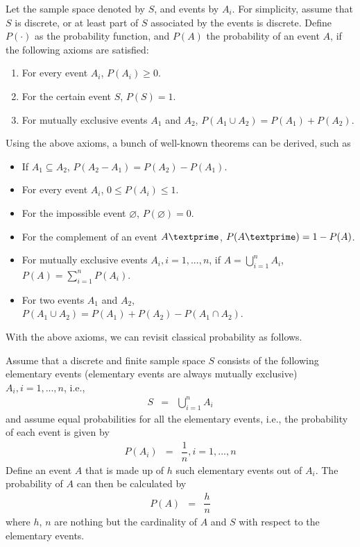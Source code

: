 Let the sample space denoted by $S$, and events by $A_i$. For simplicity, assume that $S$ is discrete, or at least part of $S$ associated by the events is discrete. Define $P(\cdot)$ as the probability function, and $P(A)$ the probability of an event $A$, if the following axioms are satisfied:
\begin{enumerate}
  \item For every event $A_i$, $P(A_i)\geq 0$.
  \item For the certain event $S$, $P(S)=1$.
  \item For mutually exclusive events $A_1$ and $A_2$, $P\left(A_1\cup A_2\right) = P(A_1)+P(A_2)$.
\end{enumerate}

Using the above axioms, a bunch of well-known theorems can be derived, such as
\begin{itemize}
  \item If $A_1 \subseteq A_2$, $P(A_2-A_1) = P(A_2)-P(A_1)$.
  \item For every event $A_i$, $0\leq P(A_i) \leq 1$.
  \item For the impossible event $\varnothing$, $P(\varnothing)=0$.
  \item For the complement of an event $A\textprime$, $P(A\textprime)=1-P(A)$.
  \item For mutually exclusive events $A_i, i=1,...,n$, if $A = \bigcup_{i=1}^{n} A_i$, $P(A) = \sum_{i=1}^{n}P(A_i)$.
  \item For two events $A_1$ and $A_2$, $P\left(A_1\cup A_2\right) = P(A_1)+P(A_2)-P\left(A_1\cap A_2\right)$.
\end{itemize}

With the above axioms, we can revisit classical probability as follows.

Assume that a discrete and finite sample space $S$ consists of the following elementary events (elementary events are always mutually exclusive) $A_i, i=1,...,n$, i.e.,
\begin{eqnarray}
  S &=& \bigcup_{i=1}^{n} A_i \nonumber
\end{eqnarray}
and assume equal probabilities for all the elementary events, i.e., the probability of each event is given by
\begin{eqnarray}
  P(A_i) &=& \dfrac{1}{n}, i=1,...,n \nonumber
\end{eqnarray}
Define an event $A$ that is made up of $h$ such elementary events out of $A_i$. The probability of $A$ can then be calculated by
\begin{eqnarray}
  P(A) &=& \dfrac{h}{n} \nonumber
\end{eqnarray}
where $h$, $n$ are nothing but the cardinality of $A$ and $S$ with respect to the elementary events.


